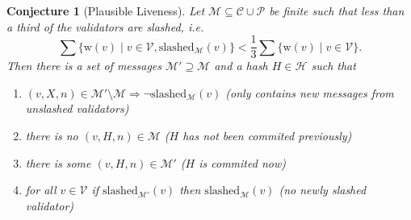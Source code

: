 \documentclass[11pt,letterpaper]{article}
\newtheorem{conjecture}[dummytheorem]{Conjecture}
\newcommand{\validators}{\mathcal{V}}
\newcommand{\messages}{\mathcal{M}}
\begin{document}
\begin{conjecture}[Plausible Liveness]
Let $\messages \subseteq \mathcal{C} \cup \mathcal{P}$ be finite such that
less than a third of the validators are slashed, i.e.
\[
  \sum\{\mathrm{w}(v) \mid v \in \mathcal{V}, \mathrm{slashed}_\messages(v)\} < \frac{1}{3} \sum\{\mathrm{w}(v) \mid v \in \mathcal{V}\}.
\]
Then there is a set of messages $\messages' \supseteq \messages$ and a hash
$H \in \mathcal{H}$ such that
\begin{enumerate}
\item $(v, X, n) \in \messages' \setminus \messages \Rightarrow \neg \mathrm{slashed}_\messages(v)$
(only contains new messages from unslashed validators)
\item there is no $(v, H, n) \in \messages$ ($H$ has not been commited previously)
\item there is some $(v, H, n) \in \messages'$ ($H$ is commited now)
\item for all $v \in \validators$ if $\mathrm{slashed}_{\messages'}(v)$
then $\mathrm{slashed}_{\messages}(v)$ (no newly slashed validator)
\end{enumerate}
\end{conjecture}
\end{document}
